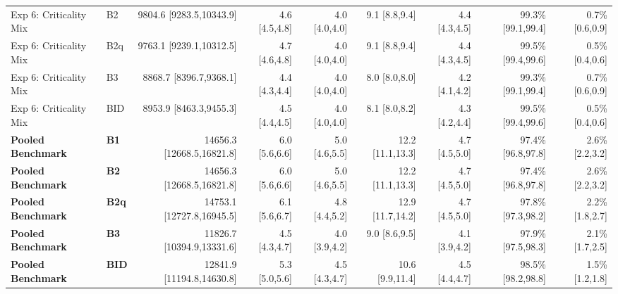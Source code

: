 \begin{table}[t]
{\begin{tabular}{llrrrrrrr}
Exp 6: Criticality Mix & B2 & 9804.6 [9283.5,10343.9] & 4.6 [4.5,4.8] & 4.0 [4.0,4.0] & 9.1 [8.8,9.4] & 4.4 [4.3,4.5] & 99.3\% [99.1,99.4] & 0.7\% [0.6,0.9] \\
Exp 6: Criticality Mix & B2q & 9763.1 [9239.1,10312.5] & 4.7 [4.6,4.8] & 4.0 [4.0,4.0] & 9.1 [8.8,9.4] & 4.4 [4.3,4.5] & 99.5\% [99.4,99.6] & 0.5\% [0.4,0.6] \\
Exp 6: Criticality Mix & B3 & 8868.7 [8396.7,9368.1] & 4.4 [4.3,4.4] & 4.0 [4.0,4.0] & 8.0 [8.0,8.0] & 4.2 [4.1,4.2] & 99.3\% [99.1,99.4] & 0.7\% [0.6,0.9] \\
Exp 6: Criticality Mix & BID & 8953.9 [8463.3,9455.3] & 4.5 [4.4,4.5] & 4.0 [4.0,4.0] & 8.1 [8.0,8.2] & 4.3 [4.2,4.4] & 99.5\% [99.4,99.6] & 0.5\% [0.4,0.6] \\
\midrule
\textbf{Pooled Benchmark} & \textbf{B1} & 14656.3 [12668.5,16821.8] & 6.0 [5.6,6.6] & 5.0 [4.6,5.5] & 12.2 [11.1,13.3] & 4.7 [4.5,5.0] & 97.4\% [96.8,97.8] & 2.6\% [2.2,3.2] \\
\textbf{Pooled Benchmark} & \textbf{B2} & 14656.3 [12668.5,16821.8] & 6.0 [5.6,6.6] & 5.0 [4.6,5.5] & 12.2 [11.1,13.3] & 4.7 [4.5,5.0] & 97.4\% [96.8,97.8] & 2.6\% [2.2,3.2] \\
\textbf{Pooled Benchmark} & \textbf{B2q} & 14753.1 [12727.8,16945.5] & 6.1 [5.6,6.7] & 4.8 [4.4,5.2] & 12.9 [11.7,14.2] & 4.7 [4.5,5.0] & 97.8\% [97.3,98.2] & 2.2\% [1.8,2.7] \\
\textbf{Pooled Benchmark} & \textbf{B3} & 11826.7 [10394.9,13331.6] & 4.5 [4.3,4.7] & 4.0 [3.9,4.2] & 9.0 [8.6,9.5] & 4.1 [3.9,4.2] & 97.9\% [97.5,98.3] & 2.1\% [1.7,2.5] \\
\textbf{Pooled Benchmark} & \textbf{BID} & 12841.9 [11194.8,14630.8] & 5.3 [5.0,5.6] & 4.5 [4.3,4.7] & 10.6 [9.9,11.4] & 4.5 [4.4,4.7] & 98.5\% [98.2,98.8] & 1.5\% [1.2,1.8] \\
\bottomrule
\end{tabular}
}
\end{table}
